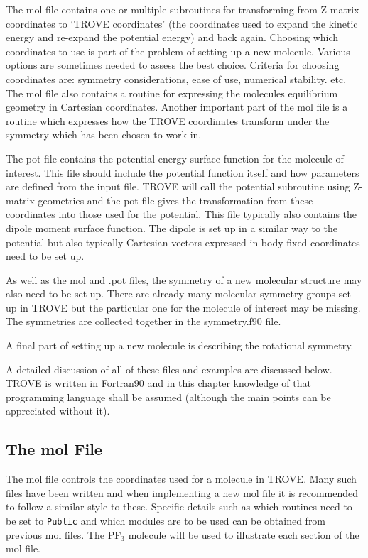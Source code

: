 The mol file contains one or multiple subroutines for transforming from Z-matrix coordinates to `TROVE coordinates' 
(the coordinates used to expand the kinetic energy and re-expand the potential energy) and back again. Choosing which
coordinates to use is part of the problem of setting up a new molecule. Various options are sometimes needed to assess 
the best choice. Criteria for choosing coordinates are: symmetry considerations, ease of use, numerical stability. etc.
The mol file also contains a routine for expressing the molecules equilibrium geometry in Cartesian coordinates. Another 
important part of the mol file is a routine which expresses how the TROVE coordinates transform under the symmetry which has
been chosen to work in. 

The pot file contains the potential energy surface function for the molecule of interest. This file should include the potential
function itself and how parameters are defined from the input file. TROVE will call the potential subroutine using
Z-matrix geometries and the pot file gives the transformation from these coordinates into those used for the potential.
This file typically also contains the dipole moment surface function. The dipole is set up in a similar way to the 
potential but also typically Cartesian vectors expressed in body-fixed coordinates need to be set up.

As well as the mol and .pot files, the symmetry of a new molecular structure may also need to be set up. There are already 
many molecular symmetry groups set up in TROVE but the particular one for the molecule of interest may be missing. The 
symmetries are collected together in the symmetry.f90 file. 

A final part of setting up a new molecule is describing the rotational symmetry. 

A detailed discussion of all of these files and examples are discussed below. TROVE is written in Fortran90 and in this 
chapter knowledge of that programming language shall be assumed (although the main points can be appreciated without it).

\subsection{The mol File}

The mol file controls the coordinates used for a molecule in TROVE. Many such files have been written and when implementing
a new mol file it is recommended to follow a similar style to these. Specific details such as which routines need to be 
set to \verb|Public| and which modules are to be used can be obtained from previous mol files. The PF$_3$ molecule will be used
 to illustrate  each section of the mol file.

